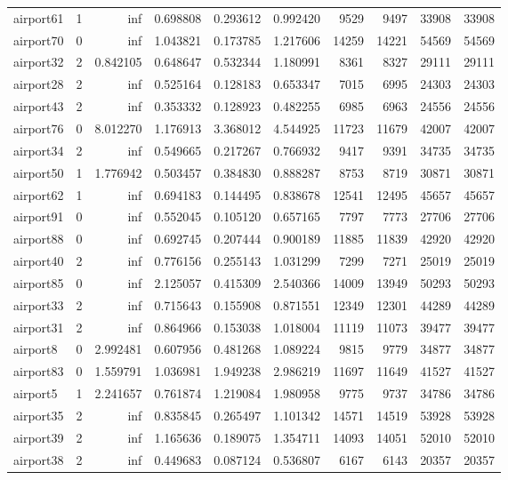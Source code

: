 \begin{longtable}{|l|r|r|r|r|r|r|r|r|r|}
airport61 & 1 & inf & 0.698808 & 0.293612 & 0.992420 & 9529 & 9497 & 33908 & 33908 \\
airport70 & 0 & inf & 1.043821 & 0.173785 & 1.217606 & 14259 & 14221 & 54569 & 54569 \\
airport32 & 2 & 0.842105 & 0.648647 & 0.532344 & 1.180991 & 8361 & 8327 & 29111 & 29111 \\
airport28 & 2 & inf & 0.525164 & 0.128183 & 0.653347 & 7015 & 6995 & 24303 & 24303 \\
airport43 & 2 & inf & 0.353332 & 0.128923 & 0.482255 & 6985 & 6963 & 24556 & 24556 \\
airport76 & 0 & 8.012270 & 1.176913 & 3.368012 & 4.544925 & 11723 & 11679 & 42007 & 42007 \\
airport34 & 2 & inf & 0.549665 & 0.217267 & 0.766932 & 9417 & 9391 & 34735 & 34735 \\
airport50 & 1 & 1.776942 & 0.503457 & 0.384830 & 0.888287 & 8753 & 8719 & 30871 & 30871 \\
airport62 & 1 & inf & 0.694183 & 0.144495 & 0.838678 & 12541 & 12495 & 45657 & 45657 \\
airport91 & 0 & inf & 0.552045 & 0.105120 & 0.657165 & 7797 & 7773 & 27706 & 27706 \\
airport88 & 0 & inf & 0.692745 & 0.207444 & 0.900189 & 11885 & 11839 & 42920 & 42920 \\
airport40 & 2 & inf & 0.776156 & 0.255143 & 1.031299 & 7299 & 7271 & 25019 & 25019 \\
airport85 & 0 & inf & 2.125057 & 0.415309 & 2.540366 & 14009 & 13949 & 50293 & 50293 \\
airport33 & 2 & inf & 0.715643 & 0.155908 & 0.871551 & 12349 & 12301 & 44289 & 44289 \\
airport31 & 2 & inf & 0.864966 & 0.153038 & 1.018004 & 11119 & 11073 & 39477 & 39477 \\
airport8 & 0 & 2.992481 & 0.607956 & 0.481268 & 1.089224 & 9815 & 9779 & 34877 & 34877 \\
airport83 & 0 & 1.559791 & 1.036981 & 1.949238 & 2.986219 & 11697 & 11649 & 41527 & 41527 \\
airport5 & 1 & 2.241657 & 0.761874 & 1.219084 & 1.980958 & 9775 & 9737 & 34786 & 34786 \\
airport35 & 2 & inf & 0.835845 & 0.265497 & 1.101342 & 14571 & 14519 & 53928 & 53928 \\
airport39 & 2 & inf & 1.165636 & 0.189075 & 1.354711 & 14093 & 14051 & 52010 & 52010 \\
airport38 & 2 & inf & 0.449683 & 0.087124 & 0.536807 & 6167 & 6143 & 20357 & 20357 \\

\end{longtable}
